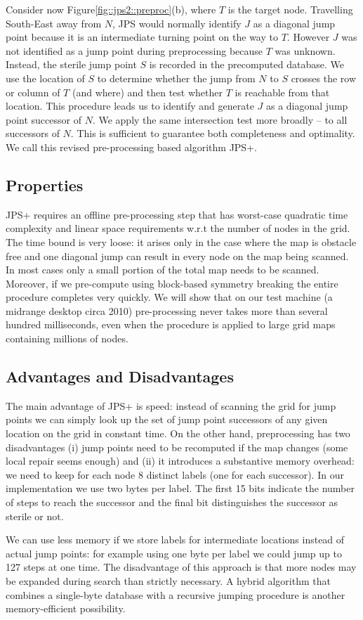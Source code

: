 Consider now Figure\ref{fig::jps2::preproc}(b), where $T$ is the target node.  
Travelling South-East away from $N$, JPS would normally identify 
$J$ as a diagonal jump point because it is an intermediate turning
point on the way to $T$.
However $J$ was not identified as a jump point during preprocessing 
because $T$ was unknown.  
Instead, the sterile jump point $S$ is recorded in the precomputed 
database. We use the location of $S$ to determine whether the jump from 
$N$ to $S$ crosses the row or column of $T$ (and where) and then test 
whether $T$ is reachable from that location. This procedure 
leads us to identify and generate $J$ as a diagonal jump point successor
of $N$. We apply the same intersection test more broadly -- to all 
successors of $N$. This is sufficient to guarantee both completeness 
and optimality. We call this revised pre-processing based algorithm 
JPS+.
\subsection{Properties}
JPS+ requires an offline pre-processing step that has worst-case quadratic 
time complexity and linear space requirements w.r.t the number of nodes in 
the grid. The time bound is very loose: it arises only in the case 
where the map is obstacle free and one diagonal jump can result in
every node on the map being scanned. In most cases only a small portion
of the total map needs to be scanned. Moreover, if we pre-compute using block-based 
symmetry breaking the entire procedure completes very quickly.
We will show that on our test machine (a midrange desktop
circa 2010) pre-processing never takes more than several hundred milliseconds,
even when the procedure is applied to large grid maps containing millions
of nodes.
\subsection{Advantages and Disadvantages}
The main advantage of JPS+ is speed: instead of scanning the grid for jump
points we can simply look up the set of jump point successors of any given
location on the grid in constant time.  On the other hand, preprocessing has
two disadvantages (i) jump points need to be recomputed if the map changes
(some local repair seems enough) and (ii) it introduces a substantive memory
overhead: we need to keep for each node 8 distinct labels (one for each
successor).  In our implementation we use two bytes per label. The first 15
bits indicate the number of steps to reach the successor and the final bit
distinguishes the successor as sterile or not.
\par
We can use less memory if we store labels for intermediate locations instead
of actual jump points: for example using one byte per label we could jump up
to 127 steps at one time. The disadvantage of this approach is that more nodes
may be expanded during search than strictly necessary. A hybrid algorithm that
combines a single-byte database with a recursive jumping procedure is another
memory-efficient possibility.


